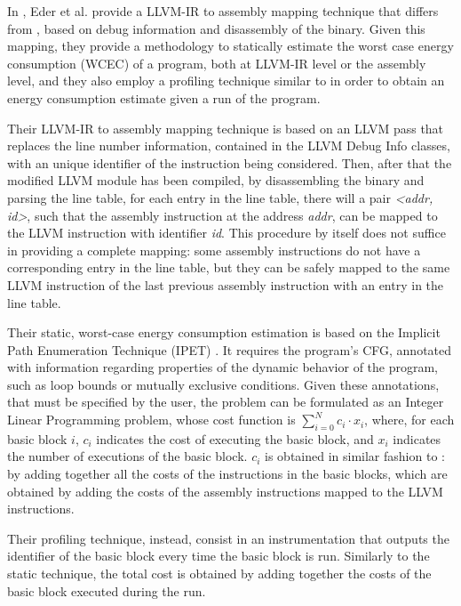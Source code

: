 In \cite{eder}, Eder et al. provide a LLVM-IR to assembly mapping technique that differs from \cite{brando2011}, based on debug information and disassembly of the binary. Given this mapping, they provide a methodology to statically estimate the worst case energy consumption (WCEC) of a program, both at LLVM-IR level or the assembly level, and they also employ a profiling technique similar to \cite{brando2011} in order to obtain an energy consumption estimate given a run of the program. \par 
Their LLVM-IR to assembly mapping technique is based on an LLVM pass that replaces the line number information, contained in the LLVM Debug Info classes, with an unique identifier of the instruction being considered. Then, after that the modified LLVM module has been compiled, by disassembling the binary and parsing the line table, for each entry in the line table, there will a pair \emph{<addr, id>}, such that the assembly instruction at the address \emph{addr}, can be mapped to the LLVM instruction with identifier \emph{id}.
\newline This procedure by itself does not suffice in providing a complete mapping: some assembly instructions do not have a corresponding entry in the line table, but they can be safely mapped to the same LLVM instruction of the last previous assembly instruction with an entry in the line table. \par 
Their static, worst-case energy consumption estimation is based on the Implicit Path Enumeration Technique (IPET) \cite{ipet}. It requires the program's CFG, annotated with information regarding properties of the dynamic behavior of the program, such as loop bounds or mutually exclusive conditions.
Given these annotations, that must be specified by the user, the problem can be formulated as an Integer Linear Programming problem, whose cost function is $\sum_{i=0}^{N} c_{i} \cdot x_{i}$, where, for each basic block $i$, $c_{i}$ indicates the cost of executing the basic block, and $x_{i}$ indicates the number of executions of the basic block. $c_{i}$ is obtained in similar fashion to \cite{brando2011}: by adding together all the costs of the instructions in the basic blocks, which are obtained by adding the costs of the assembly instructions mapped to the LLVM instructions. \par 
Their profiling technique, instead, consist in an instrumentation that outputs the identifier of the basic block every time the basic block is run. Similarly to the static technique, the total cost is obtained by adding together the costs of the basic block executed during the run.
\\[1in]


